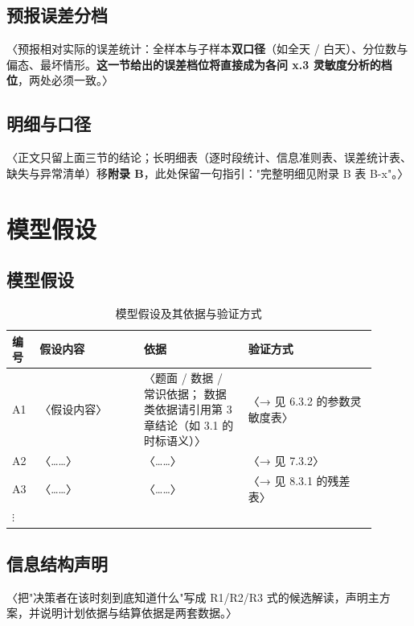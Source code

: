 \documentclass[12pt,a4paper]{ctexart}
\newif\ifwritemode
\newcommand{\guide}[1]{%
  \ifwritemode\par\noindent{\small\color{guideblue}\textbf{【写作提示】}#1}\par\fi}
\newcommand{\tabhead}[1]{\textbf{#1}}
\begin{document}
\subsection{预报误差分档}
〈预报相对实际的误差统计：全样本与子样本\textbf{双口径}（如全天 / 白天）、分位数与偏态、最坏情形。\textbf{这一节给出的误差档位将直接成为各问 x.3 灵敏度分析的档位}，两处必须一致。〉

\subsection{明细与口径}
〈正文只留上面三节的结论；长明细表（逐时段统计、信息准则表、误差统计表、缺失与异常清单）移\textbf{附录 B}，此处保留一句指引："完整明细见附录 B 表 B-x"。〉

\section{模型假设}\label{sec:assumption}
\guide{表格四列缺一不可；「依据」列优先引用第 3 章的核查结论；「验证方式」一列必须能指到某个问题章的 x.3 表，否则该假设在定稿时会被判定为"没验证"。}

\subsection{模型假设}
\begin{table}[htbp]\centering\footnotesize
  \caption{模型假设及其依据与验证方式}\label{tab:assumption}
  \begin{tabular}{p{0.06\linewidth}p{0.26\linewidth}p{0.26\linewidth}p{0.32\linewidth}}
    \toprule
    \tabhead{编号} & \tabhead{假设内容} & \tabhead{依据} & \tabhead{验证方式} \\
    \midrule
    A1 & 〈假设内容〉 & 〈题面 / 数据 / 常识依据；
         数据类依据请引用第 3 章结论（如 3.1 的时标语义）〉 & 〈→ 见 6.3.2 的参数灵敏度表〉 \\
    A2 & 〈……〉 & 〈……〉 & 〈→ 见 7.3.2〉 \\
    A3 & 〈……〉 & 〈……〉 & 〈→ 见 8.3.1 的残差表〉 \\
    $\vdots$ & & & \\
    \bottomrule
  \end{tabular}
\end{table}

\subsection{信息结构声明}
〈把"决策者在该时刻到底知道什么"写成 R1/R2/R3 式的候选解读，声明主方案，并说明计划依据与结算依据是两套数据。〉
\end{document}
